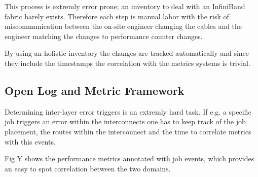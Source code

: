 This process is extremly error prone; an inventory to deal with an InfiniBand fabric barely exists. Therefore each step is manual labor with the risk of miscommunication between the on-site engineer changing the
cables and the engineer matching the changes to performance counter changes.

By using an holistic inventory the changes are tracked automatically and since they include the timestamps the correlation with the metrics systems is trivial.

\subsection{Open Log and Metric Framework}
Determining inter-layer error triggers is an extremly hard task. If e.g. a specific job triggers an error within the interconnects one has to keep track of the job placement, the routes within the interconnect and
the time to correlate metrics with this events.

Fig Y shows the performance metrics annotated with job events, which provides an easy to spot correlation between the two domains.